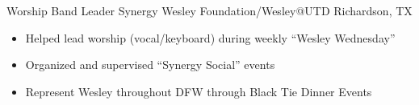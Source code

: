 \documentclass[11pt,letterpaper,roman]{moderncv} %
\begin{document}
{%
{Worship Band Leader}
{Synergy Wesley Foundation/Wesley@UTD}
{Richardson, TX}{}{
\begin{itemize}
    \item Helped lead worship (vocal/keyboard) during weekly ``Wesley Wednesday''
    \item Organized and supervised ``Synergy Social'' events
    \item Represent Wesley throughout DFW through Black Tie Dinner Events
\end{itemize}
}






}









\end{document}
